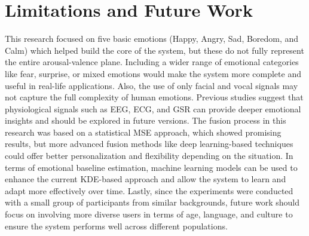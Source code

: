 \section{Limitations and Future Work}
\label{sec:limitations-future-work}

This research focused on five basic emotions (Happy, Angry, Sad, Boredom, and Calm) which helped build the core of the system, but these do not fully represent the entire arousal-valence plane. Including a wider range of emotional categories like fear, surprise, or mixed emotions would make the system more complete and useful in real-life applications. Also, the use of only facial and vocal signals may not capture the full complexity of human emotions. Previous studies suggest that physiological signals such as EEG, ECG, and GSR can provide deeper emotional insights and should be explored in future versions. The fusion process in this research was based on a statistical MSE approach, which showed promising results, but more advanced fusion methods like deep learning-based techniques could offer better personalization and flexibility depending on the situation. In terms of emotional baseline estimation, machine learning models can be used to enhance the current KDE-based approach and allow the system to learn and adapt more effectively over time. Lastly, since the experiments were conducted with a small group of participants from similar backgrounds, future work should focus on involving more diverse users in terms of age, language, and culture to ensure the system performs well across different populations.